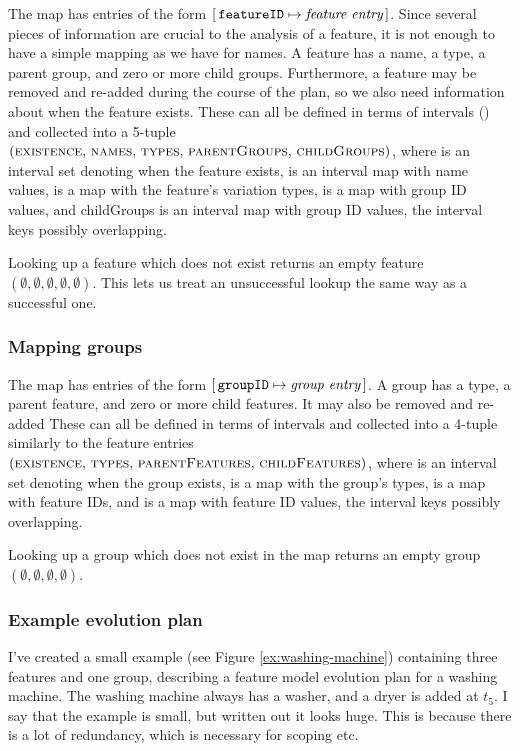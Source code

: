 
The \features{} map has entries of the form $[ \,\texttt{featureID} \mapsto \textit{feature entry}\, ]$. Since several pieces of information are crucial to the analysis of a feature, it is not enough to have a simple mapping as we have for names.
A feature has a name, a type, a parent group, and zero or more child groups. Furthermore, a feature may be removed and re-added during the course of the plan, so we also need information about when the feature exists.
These can all be defined in terms of intervals () and collected into a 5-tuple $(\textsc{existence} , \allowbreak \, \textsc{names} , \allowbreak \, \textsc{types} , \allowbreak \, \textsc{parentGroups} , \allowbreak \, \textsc{childGroups})$, where  is an interval set denoting when the feature exists,  is an interval map with name values,  is a map with the feature's variation types,  is a map with group ID values, and childGroups is an interval map with group ID values, the interval keys possibly overlapping. 

Looking up a feature which does not exist returns an empty feature $(\emptyset \comma \emptyset \comma \emptyset \comma \emptyset \comma \emptyset)$. This lets us treat an unsuccessful lookup the same way as a successful one.

\subsubsection{Mapping groups}
\label{subsub:mapping-groups}

The \groups{} map has entries of the form $[ \,\texttt{groupID} \mapsto \textit{group entry}\, ]$. A group has a type, a parent feature, and zero or more child features. It may also be removed and re-added These can all be defined in terms of intervals and collected into a 4-tuple similarly to the feature entries $(\textsc{existence} , \allowbreak \, \textsc{types}  , \allowbreak \, \textsc{parentFeatures} , \allowbreak \, \textsc{childFeatures})$, where  is an interval set denoting when the group exists,  is a map with the group's types,  is a map with feature IDs, and  is a map with feature ID values, the interval keys possibly overlapping.

Looking up a group which does not exist in the map returns an empty group $(\emptyset \comma \emptyset \comma \emptyset \comma \emptyset)$. 

\subsubsection{Example evolution plan}
I've created a small example (see Figure \vref{ex:washing-machine}) containing three features and one group, describing a feature model evolution plan for a washing machine. The washing machine always has a washer, and a dryer is added at $t_5$. I say that the example is small, but written out it looks huge. This is because there is a lot of redundancy, which is necessary for scoping etc. 


